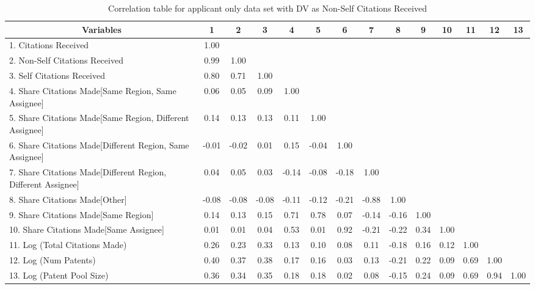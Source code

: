 \begin{table}[htbp]\centering \caption{Correlation table for applicant only data set with DV as Non-Self Citations Received\label{a.ncorrelation}}
\scriptsize
\singlespacing
\begin{tabular}{l  c  c  c  c  c  c  c  c  c  c  c  c  c }\hline\hline
\multicolumn{1}{c}{Variables} &1&2&3&4&5&6&7&8&9&10&11&12&13\\ \hline
1. Citations Received&1.00\\
2. Non-Self Citations Received&0.99&1.00\\
3. Self Citations Received&0.80&0.71&1.00\\
4. Share Citations Made[Same Region, Same Assignee]&0.06&0.05&0.09&1.00\\
5. Share Citations Made[Same Region, Different Assignee]&0.14&0.13&0.13&0.11&1.00\\
6. Share Citations Made[Different Region, Same Assignee]&-0.01&-0.02&0.01&0.15&-0.04&1.00\\
7. Share Citations Made[Different Region, Different Assignee]&0.04&0.05&0.03&-0.14&-0.08&-0.18&1.00\\
8. Share Citations Made[Other]&-0.08&-0.08&-0.08&-0.11&-0.12&-0.21&-0.88&1.00\\
9. Share Citations Made[Same Region]&0.14&0.13&0.15&0.71&0.78&0.07&-0.14&-0.16&1.00\\
10. Share Citations Made[Same Assignee]&0.01&0.01&0.04&0.53&0.01&0.92&-0.21&-0.22&0.34&1.00\\
11. Log (Total Citations Made)&0.26&0.23&0.33&0.13&0.10&0.08&0.11&-0.18&0.16&0.12&1.00\\
12. Log (Num Patents)&0.40&0.37&0.38&0.17&0.16&0.03&0.13&-0.21&0.22&0.09&0.69&1.00\\
13. Log (Patent Pool Size)&0.36&0.34&0.35&0.18&0.18&0.02&0.08&-0.15&0.24&0.09&0.69&0.94&1.00\\
\hline \hline 
 \end{tabular}
\end{table}
